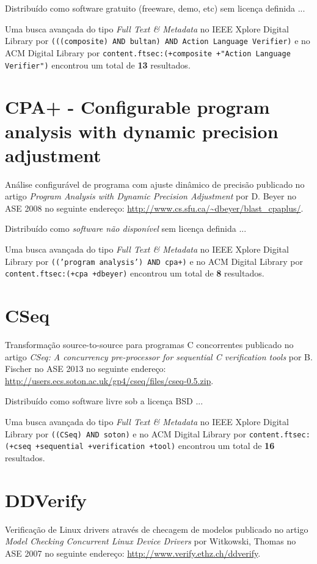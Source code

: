 Distribuído como software gratuito (freeware, demo, etc)
sem licença definida ...


Uma busca avançada do tipo {\it Full Text \& Metadata} no IEEE Xplore Digital Library por
\texttt{(((composite) AND bultan) AND Action Language Verifier)}
e no ACM Digital Library por
\texttt{content.ftsec:(+composite +"Action Language Verifier")}
encontrou um total de
{\bf 13}
resultados.

\section{CPA+ - Configurable program analysis with dynamic precision adjustment}

Análise configurável de programa com ajuste dinâmico de precisão
publicado no artigo
{\it Program Analysis with Dynamic Precision Adjustment}
por
D. Beyer
no
ASE
2008
no seguinte endereço:
\url{http://www.cs.sfu.ca/~dbeyer/blast_cpaplus/}.

Distribuído como {\it software não disponível}
sem licença definida ...


Uma busca avançada do tipo {\it Full Text \& Metadata} no IEEE Xplore Digital Library por
\texttt{(('program analysis') AND cpa+)}
e no ACM Digital Library por
\texttt{content.ftsec:(+cpa +dbeyer)}
encontrou um total de
{\bf 8}
resultados.

\section{CSeq}

Transformação source-to-source para programas C concorrentes
publicado no artigo
{\it CSeq: A concurrency pre-processor for sequential C verification tools}
por
B. Fischer
no
ASE
2013
no seguinte endereço:
\url{http://users.ecs.soton.ac.uk/gp4/cseq/files/cseq-0.5.zip}.

Distribuído como software livre
sob a licença BSD ...


Uma busca avançada do tipo {\it Full Text \& Metadata} no IEEE Xplore Digital Library por
\texttt{((CSeq) AND soton)}
e no ACM Digital Library por
\texttt{content.ftsec:(+cseq +sequential +verification +tool)}
encontrou um total de
{\bf 16}
resultados.

\section{DDVerify}

Verificação de Linux drivers através de checagem de modelos
publicado no artigo
{\it Model Checking Concurrent Linux Device Drivers}
por
Witkowski, Thomas
no
ASE
2007
no seguinte endereço:
\url{http://www.verify.ethz.ch/ddverify}.

